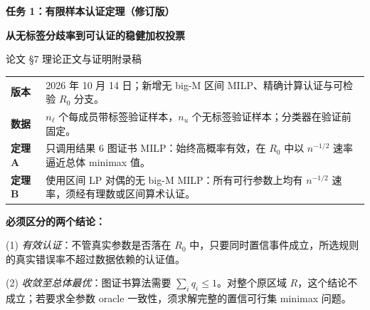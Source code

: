 \documentclass[11pt,a4paper]{ctexart}
\theoremstyle{definition}
\begin{document}
\thispagestyle{empty}
\vspace*{1.1cm}
\noindent{\color{teal}\rule{\textwidth}{1.7pt}}\par
\vspace{.6cm}
{\Huge\bfseries 任务 1：有限样本认证定理（修订版）}\par
\vspace{.24cm}
{\LARGE\bfseries 从无标签分歧率到可认证的稳健加权投票}\par
\vspace{.6cm}
{\Large 论文 \S7 理论正文与证明附录稿}\par
\vspace{.7cm}
\noindent\begin{tabularx}{\textwidth}{@{}p{27mm}X@{}}
\textbf{版本} & 2026 年 10 月 14 日；新增无 big-M 区间 MILP、精确计算认证与可检验 $R_0$ 分支。\\
\textbf{数据} & $n_\ell$ 个每成员带标签验证样本，$n_u$ 个无标签验证样本；分类器在验证前固定。\\
\textbf{定理 A} & 只调用结果 6 图证书 MILP：始终高概率有效，在 $R_0$ 中以 $n^{-1/2}$ 速率逼近总体 minimax 值。\\
\textbf{定理 B} & 使用区间 LP 对偶的无 big-M MILP：所有可行参数上均有 $n^{-1/2}$ 速率，须经有理数或区间算术认证。\\
\end{tabularx}
\vfill
\begin{keybox}
\textbf{必须区分的两个结论：}\par
(1) \emph{有效认证}：不管真实参数是否落在 $R_0$ 中，只要同时置信事件成立，所选规则的真实错误率不超过数据依赖的认证值。\par
(2) \emph{收敛至总体最优}：图证书算法需要 $\sum_iq_i\le1$。对整个原区域 $R$，这个结论不成立；若要求全参数 oracle 一致性，须求解完整的置信可行集 minimax 问题。
\end{keybox}
\vspace{.6cm}
\newpage
\tableofcontents
\newpage
\end{document}

